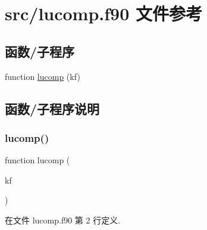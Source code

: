 \hypertarget{lucomp_8f90}{}\section{src/lucomp.f90 文件参考}
\label{lucomp_8f90}
\subsection*{函数/子程序}
\begin{DoxyCompactItemize}
\item 
function \mbox{\hyperlink{lucomp_8f90_a49bf81240e363be3c62fc31897fe5a8f}{lucomp}} (kf)
\end{DoxyCompactItemize}


\subsection{函数/子程序说明}
\mbox{\label{lucomp_8f90_a49bf81240e363be3c62fc31897fe5a8f}} 
\subsubsection{\texorpdfstring{lucomp()}{lucomp()}}
{\footnotesize\ttfamily function lucomp (\begin{DoxyParamCaption}\item[{}]{kf }\end{DoxyParamCaption})}



在文件 lucomp.\+f90 第 2 行定义.

